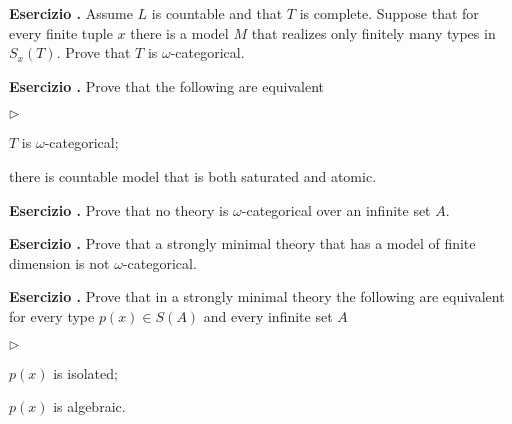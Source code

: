 \documentclass[10pt]{article}
\newcommand{\labella}[1]{{\sf\footnotesize #1}\hfill}
\renewenvironment{itemize}
  {\begin{list}{$\triangleright$}{%
   \setlength{\parskip}{0mm}
   \setlength{\topsep}{0mm}
   \setlength{\rightmargin}{0mm}
   \setlength{\listparindent}{0mm}
   \setlength{\itemindent}{0mm}
   \setlength{\labelwidth}{3ex}
   \setlength{\itemsep}{0mm}
   \setlength{\parsep}{0mm}
   \setlength{\partopsep}{0mm}
   \setlength{\labelsep}{1ex}
   \setlength{\leftmargin}{\labelwidth+\labelsep}
   \let\makelabel\labella}}{%
   \end{list}}
\newcounter{ex}
\newenvironment{exercise}{\clearpage\addtocounter{ex}{1}\textbf{Esercizio \theex.\quad}}{}
\begin{document}
\begin{exercise} 
Assume $L$ is countable and that $T$ is complete.
Suppose that for every finite tuple $x$ there is a model $M$ that realizes only finitely many types in $S_x(T)$.
Prove that $T$ is $\omega$-categorical.
\end{exercise}



\begin{exercise}\label{ex_omega_cat_sat=atomic}
Prove that the following are equivalent
\begin{itemize}   
\item[1.] $T$ is $\omega$-categorical;
\item[2.] there is countable model that is both saturated and atomic.
\end{itemize}
\end{exercise}

\clearpage%
\setcounter{ex}{0}


\begin{exercise}
Prove that no theory is $\omega$-categorical over an infinite set $A$.
\end{exercise}

\begin{exercise}
Prove that a strongly minimal theory that has a model of finite dimension is not $\omega$-categorical.
\end{exercise}

\begin{exercise}
Prove that in a strongly minimal theory the following are equivalent for every type $p(x)\in S(A)$ and every infinite set $A$
\begin{itemize}   
\item[1.] $p(x)$ is isolated;
\item[2.] $p(x)$ is algebraic.
\end{itemize}
\end{exercise}
\end{document}
